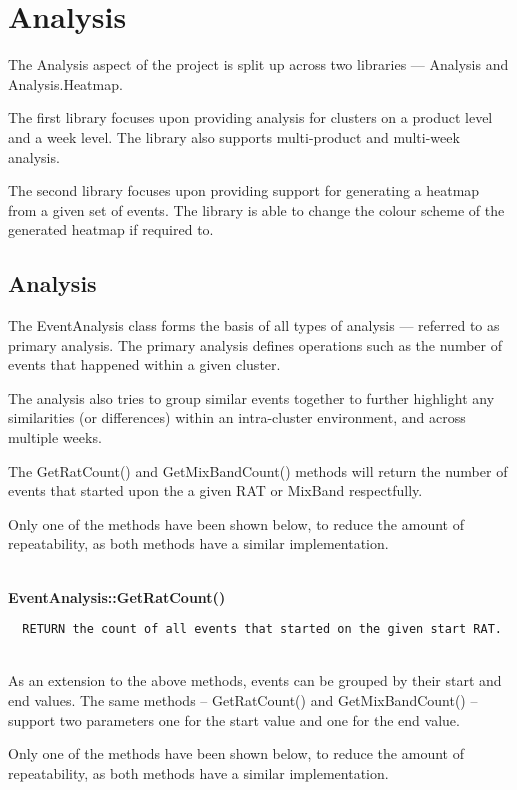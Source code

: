\section{Analysis}
The Analysis aspect of the project is split up across two libraries --- 
Analysis and Analysis.Heatmap.

The first library focuses upon providing analysis for clusters on a product 
level and a week level. The library also supports multi-product and multi-week 
analysis.

The second library focuses upon providing support for generating a heatmap from
a given set of events. The library is able to change the colour scheme of the 
generated heatmap if required to.


\subsection{Analysis}
The EventAnalysis class forms the basis of all types of analysis --- referred 
to as primary analysis. The primary analysis defines operations such as the 
number of events that happened within a given cluster.

The analysis also tries to group similar events together to further highlight 
any similarities (or differences) within an intra-cluster environment, and 
across multiple weeks.

The {\ttfamily GetRatCount()} and {\ttfamily GetMixBandCount()} methods will 
return the number of events that started upon the a given RAT or MixBand 
respectfully.

Only one of the methods have been shown below, to reduce the amount of 
repeatability, as both methods have a similar implementation.

~\\
{\bfseries EventAnalysis::GetRatCount()}
\lstset{style=pseudocode}
\begin{lstlisting}
  RETURN the count of all events that started on the given start RAT.
\end{lstlisting}

~\\
As an extension to the above methods, events can be grouped by their start and 
end values. The same methods -- {\ttfamily GetRatCount()} and 
{\ttfamily GetMixBandCount()} -- support two parameters one for the start value
and one for the end value. 

Only one of the methods have been shown below, to reduce the amount of 
repeatability, as both methods have a similar implementation.


